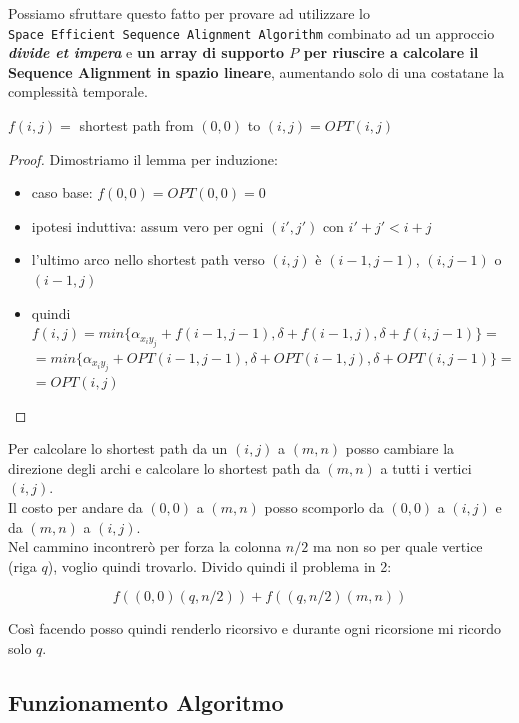 Possiamo sfruttare questo fatto per provare ad utilizzare lo
\texttt{Space\ Efficient\ Sequence\ Alignment\ Algorithm} combinato ad
un approccio \emph{\textbf{divide et impera}} e \textbf{un array di
	supporto $P$ per riuscire a calcolare il Sequence Alignment in spazio
	lineare}, aumentando solo di una costatane la complessità temporale.

\begin{lemma}
	$f(i,j) =$ shortest path from $(0,0)$ to
	$(i,j) = OPT(i,j)$
\end{lemma}
\begin{proof}
	Dimostriamo il lemma per induzione:

	\begin{itemize}
		\item caso base:
		      $f(0,0) = OPT(0,0) = 0$
		\item ipotesi induttiva: assum vero per ogni
		      $(i', j')$ con $i'+j' < i+j$
		\item l'ultimo arco nello shortest path
		      verso $(i,j)$ è $(i-1, j-1)$, $(i, j-1)$ o $(i-1, j)$
		\item quindi
		      $f(i,j) = min\{ \alpha_{x_i y_j} + f(i-1, j-1), \delta + f(i-1, j), \delta +f(i, j-1)\} =$
		      $= min\{ \alpha_{x_i y_j} + OPT(i-1, j-1), \delta + OPT(i-1, j), \delta + OPT(i, j-1)\} =$
		      $= OPT(i,j)$
	\end{itemize}
\end{proof}

Per calcolare lo shortest path da un $(i,j)$ a $(m,n)$ posso
cambiare la direzione degli archi e calcolare lo shortest path da
$(m,n)$ a tutti i vertici $(i,j)$.\\
Il costo per andare da $(0,0)$ a $(m,n)$ posso scomporlo da
$(0,0)$ a $(i,j)$ e da $(m,n)$ a $(i,j)$.\\
Nel cammino incontrerò per forza la colonna $n/2$ ma non so per quale
vertice (riga $q$), voglio quindi trovarlo.
Divido quindi il problema in 2:

$$
	f((0,0)(q,n/2)) + f((q,n/2)(m,n))
$$

Così facendo posso quindi renderlo ricorsivo e durante
ogni ricorsione mi ricordo solo $q$.

\subsection{Funzionamento Algoritmo}

